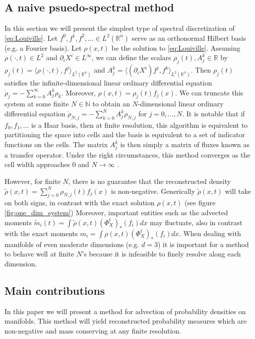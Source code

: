 \documentclass[letterpaper, 12 pt]{amsart}
\newcommand{\R}{\mathbb{R}}
\begin{document}
\subsection{A naive psuedo-spectral method}
\label{sec:naive}
  In this section we will present the simplest type of
  spectral discretization of \eqref{eq:Louiville}.
  Let $f^0,f^1,f^2,\dots \in L^2(\R^n)$ serve as an
  orthonormal Hilbert basis (e.g. a Fourier basis).
  Let $\rho(x,t)$ be the solution to \eqref{eq:Louiville}.
  Assuming $\rho(\cdot,t) \in L^2$ and $\partial_i X^i \in L^{\infty}$,
  we can define the scalars $\rho_j(t), A^k_j \in \R$
  by $\rho_j(t) = \langle \rho(\cdot ,t) , f^j \rangle_{L^2(\R^n)}$
  and $A^k_j = \langle (\partial_i X^i) f^j , f^k \rangle_{L^2(\R^n)}$.
  Then $\rho_j(t)$ satisfies the infinite-dimensional linear
  ordinary differential equation
  $
    \dot{\rho}_j = - \sum_{k=0}^{\infty}A^k_j \rho_k
  $.
  Moreover, $\rho(x,t) = \rho_j(t) f_j(x)$.
  We can truncate this system at some finite $N \in \mathbb{N}$
  to obtain an $N$-dimensional linear ordinary differential equation
  $\dot{\rho}_{N,j} = -\sum_{k=0}^{N} A^k_j \rho_{N,j}$ for $j=0,\dots,N$.
  It is notable that if $f_0,f_1,\dots$ is a Haar basis, then
  at finite resolution, this algorithm is equivalent to 
  partitioning the space into cells and the basis is equivalent
  to a set of indicator functions on the cells.
  The matrix $A^k_j$ is then simply a matrix of fluxes 
  known as a transfer operator.
  Under the right circumstances,
  this method converges as the cell width approaches $0$ and $N \to \infty$
  \cite{FroylandJungeKoltai2013}.

  However, for finite $N$, there is no guarantee that the reconstructed
  density $\tilde{\rho}(x,t) = \sum_{j=0}^N \rho_{N,j}(t) f_j(x)$
  is non-negative.
  Generically $\tilde{\rho}(x,t)$ will take on both signs, in
  contrast with the exact solution $\rho(x,t)$ (see figure \ref{fig:one_dim_system})
  Moreover, important entities such as the advected moments
  $\tilde{m}_i(t) = \int \tilde{\rho}(x,t) (\Phi_X^t)_*(f_i)dx$
  may fluctuate, also in contrast with the exact moments
  $m_i = \int \rho(x,t)  (\Phi_X^t)_*(f_i) dx$.
  When dealing with manifolds of even moderate dimensions
  (e.g. $d=3$) it is important for a method to behave well at finite $N$'s
  because it is infeasible to finely resolve along each dimension.

\subsection{Main contributions}
  In this paper we will present a method for advection of
  probability densities on manifolds.
  This method will yield reconstructed probability measures
  which are non-negative and mass conserving at any finite resolution.
\end{document}
